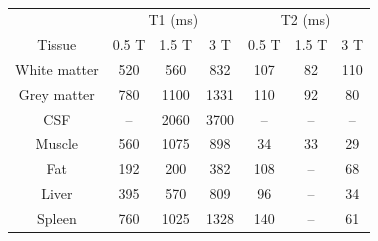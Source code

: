 \begin{table}[b!]
	\centering
	\begin{latin}
		\begin{copyrightBox}{0.7\linewidth}{\scriptsize{}}
			\begin{tabular}{|c|ccc|ccc|}
				\hline \rowcolor{headerColor}
				& \multicolumn{3}{c|}{T1 (ms)} & \multicolumn{3}{c|}{T2 (ms)} \\
				\rowcolor{headerColor} Tissue & 0.5 T & 1.5 T & 3 T & 0.5 T & 1.5 T & 3 T \\\hline\hline
				White matter & 520 & 560 & 832 & 107 & 82 & 110 \\
				Grey matter & 780 & 1100 & 1331 & 110 & 92 & 80 \\
				CSF  & –  & 2060 & 3700 & – & – & – \\
				Muscle & 560 & 1075 & 898 & 34 & 33 & 29 \\
				Fat & 192 & 200 & 382 & 108 & – & 68 \\
				Liver & 395 & 570 & 809 & 96 & – & 34 \\
				Spleen & 760 & 1025 & 1328 & 140 & – & 61 \\\hline
			\end{tabular}
		\end{copyrightBox}
	\end{latin}
	\removevspace[1.]
	\caption{}
\end{table}



\begin{figure}[t!]
	\centering
	\hfill
	\caption{}
	\label{fig:spin-echo}
\end{figure}






